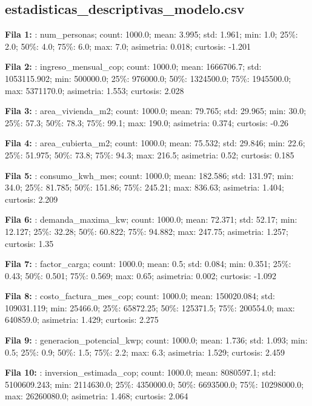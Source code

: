 \subsection*{estadisticas\_descriptivas\_modelo.csv}
{\footnotesize\textbf{Fila 1:} : num\_personas; count: 1000.0; mean: 3.995; std: 1.961; min: 1.0; 25\%: 2.0; 50\%: 4.0; 75\%: 6.0; max: 7.0; asimetria: 0.018; curtosis: -1.201\par}
{\footnotesize\textbf{Fila 2:} : ingreso\_mensual\_cop; count: 1000.0; mean: 1666706.7; std: 1053115.902; min: 500000.0; 25\%: 976000.0; 50\%: 1324500.0; 75\%: 1945500.0; max: 5371170.0; asimetria: 1.553; curtosis: 2.028\par}
{\footnotesize\textbf{Fila 3:} : area\_vivienda\_m2; count: 1000.0; mean: 79.765; std: 29.965; min: 30.0; 25\%: 57.3; 50\%: 78.3; 75\%: 99.1; max: 190.0; asimetria: 0.374; curtosis: -0.26\par}
{\footnotesize\textbf{Fila 4:} : area\_cubierta\_m2; count: 1000.0; mean: 75.532; std: 29.846; min: 22.6; 25\%: 51.975; 50\%: 73.8; 75\%: 94.3; max: 216.5; asimetria: 0.52; curtosis: 0.185\par}
{\footnotesize\textbf{Fila 5:} : consumo\_kwh\_mes; count: 1000.0; mean: 182.586; std: 131.97; min: 34.0; 25\%: 81.785; 50\%: 151.86; 75\%: 245.21; max: 836.63; asimetria: 1.404; curtosis: 2.209\par}
{\footnotesize\textbf{Fila 6:} : demanda\_maxima\_kw; count: 1000.0; mean: 72.371; std: 52.17; min: 12.127; 25\%: 32.28; 50\%: 60.822; 75\%: 94.882; max: 247.75; asimetria: 1.257; curtosis: 1.35\par}
{\footnotesize\textbf{Fila 7:} : factor\_carga; count: 1000.0; mean: 0.5; std: 0.084; min: 0.351; 25\%: 0.43; 50\%: 0.501; 75\%: 0.569; max: 0.65; asimetria: 0.002; curtosis: -1.092\par}
{\footnotesize\textbf{Fila 8:} : costo\_factura\_mes\_cop; count: 1000.0; mean: 150020.084; std: 109031.119; min: 25466.0; 25\%: 65872.25; 50\%: 125371.5; 75\%: 200554.0; max: 640859.0; asimetria: 1.429; curtosis: 2.275\par}
{\footnotesize\textbf{Fila 9:} : generacion\_potencial\_kwp; count: 1000.0; mean: 1.736; std: 1.093; min: 0.5; 25\%: 0.9; 50\%: 1.5; 75\%: 2.2; max: 6.3; asimetria: 1.529; curtosis: 2.459\par}
{\footnotesize\textbf{Fila 10:} : inversion\_estimada\_cop; count: 1000.0; mean: 8080597.1; std: 5100609.243; min: 2114630.0; 25\%: 4350000.0; 50\%: 6693500.0; 75\%: 10298000.0; max: 26260080.0; asimetria: 1.468; curtosis: 2.064\par}
